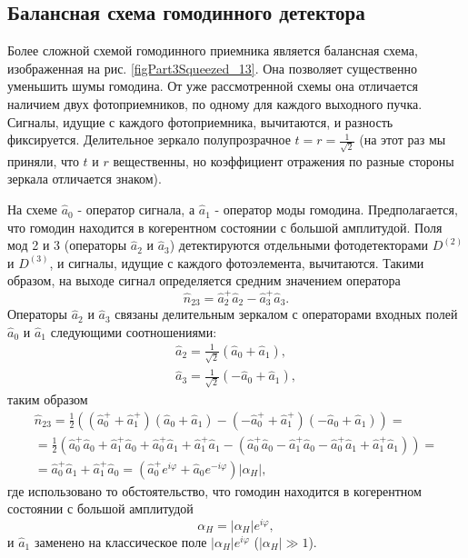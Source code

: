 

\subsection{Балансная схема гомодинного детектора}
Более сложной схемой гомодинного приемника является балансная схема,
изображенная на рис. \ref{figPart3Squeezed_13}. Она позволяет
существенно уменьшить шумы гомодина. От уже рассмотренной схемы она
отличается наличием двух фотоприемников, по одному для каждого
выходного пучка. Сигналы, идущие с каждого фотоприемника, вычитаются, и
разность фиксируется. Делительное зеркало полупрозрачное $t = r =
\frac{1}{\sqrt{2}}$ (на этот раз мы приняли, что $t$ и $r$
вещественны, но коэффициент отражения по разные стороны зеркала
отличается знаком).

На схеме $\hat{a}_0$ - оператор сигнала, а $\hat{a}_1$ - оператор моды
гомодина. Предполагается, что гомодин находится в когерентном
состоянии с большой амплитудой. Поля мод 2 и 3 (операторы $\hat{a}_2$
и $\hat{a}_3$) детектируются отдельными фотодетекторами $D^{(2)}$ и
$D^{(3)}$, и сигналы, идущие с каждого фотоэлемента, вычитаются. Такими
образом, на выходе сигнал определяется средним значением оператора
\begin{equation}
\hat{n}_{23} = \hat{a}_2^{+}\hat{a}_2 - 
\hat{a}_3^{+}\hat{a}_3.
\nonumber
\end{equation}
Операторы $\hat{a}_2$ и $\hat{a}_3$ связаны  делительным зеркалом с
операторами входных полей $\hat{a}_0$ и $\hat{a}_1$ следующими
соотношениями: 
\begin{eqnarray}
\hat{a}_2 = \frac{1}{\sqrt{2}} \left(\hat{a}_0 + \hat{a}_1\right),
\nonumber \\
\hat{a}_3 = \frac{1}{\sqrt{2}} \left(- \hat{a}_0 + \hat{a}_1\right),
\nonumber
\end{eqnarray}
таким образом
\begin{eqnarray}
\hat{n}_{23} = \frac{1}{2}
\left(
\left(\hat{a}_0^{+} + \hat{a}_1^{+}\right)
\left(\hat{a}_0 + \hat{a}_1\right)
-
\left(-\hat{a}_0^{+} + \hat{a}_1^{+}\right)
\left(-\hat{a}_0 + \hat{a}_1\right)
\right) = 
\nonumber \\
=
\frac{1}{2}
\left(
\hat{a}_0^{+}\hat{a}_0 + \hat{a}_1^{+}\hat{a}_0
+
\hat{a}_0^{+}\hat{a}_1 + \hat{a}_1^{+}\hat{a}_1
-
\left(
\hat{a}_0^{+}\hat{a}_0 - \hat{a}_1^{+}\hat{a}_0
-\hat{a}_0^{+}\hat{a}_1 + \hat{a}_1^{+}\hat{a}_1
\right)
\right) = 
\nonumber \\
=\hat{a}_0^{+}\hat{a}_1 + \hat{a}_1^{+}\hat{a}_0 = 
\left(
\hat{a}_0^{+}e^{i\varphi} + \hat{a}_0 e^{- i\varphi}
\right)\left|\alpha_H\right|,
\nonumber
\end{eqnarray}
где использовано то обстоятельство, что гомодин находится в
когерентном состоянии с большой амплитудой 
\[
\alpha_H = \left|\alpha_H\right|e^{i\varphi},
\]
и $\hat{a}_1$ заменено на классическое поле
$\left|\alpha_H\right|e^{i\varphi}$ ($\left|\alpha_H\right| \gg 1$).  

